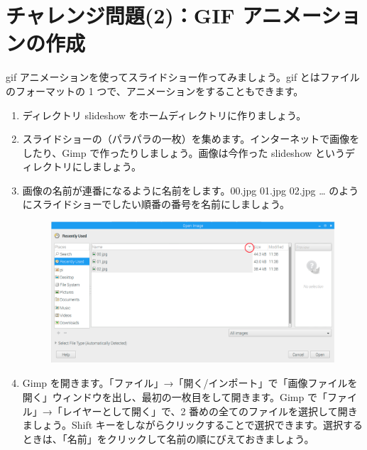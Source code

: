 \newpage
\section{チャレンジ問題(2)：GIF アニメーションの作成}
\label{GIF}
gif アニメーションを使ってスライドショー作ってみましょう。gif とはファイルのフォーマットの 1 つで、アニメーションをすることもできます。\\
\begin{enumerate}
\item ディレクトリ slideshow をホームディレクトリに作りましょう。\\
\item スライドショーの（パラパラの一枚）を集めます。インターネットで画像をしたり、Gimp で作ったりしましょう。画像は今作った slideshow というディレクトリにしましょう。\\
\item 画像の名前が連番になるように名前をします。00.jpg 01.jpg 02.jpg … のようにスライドショーでしたい順番の番号を名前にしましょう。\\
\begin{figure}[H]
    \centering
    \includegraphics[width=\linewidth]{images/chap03/text03-img025.png}
\end{figure}
\item Gimp を開きます。「ファイル」→「開く/インポート」で「画像ファイルを開く」ウィンドウを出し、最初の一枚目をして開きます。Gimp で「ファイル」→「レイヤーとして開く」で、2 番めの全てのファイルを選択して開きましょう。Shift キーをしながらクリックすることで選択できます。選択するときは、「名前」をクリックして名前の順にびえておきましょう。\\

\end{enumerate}
